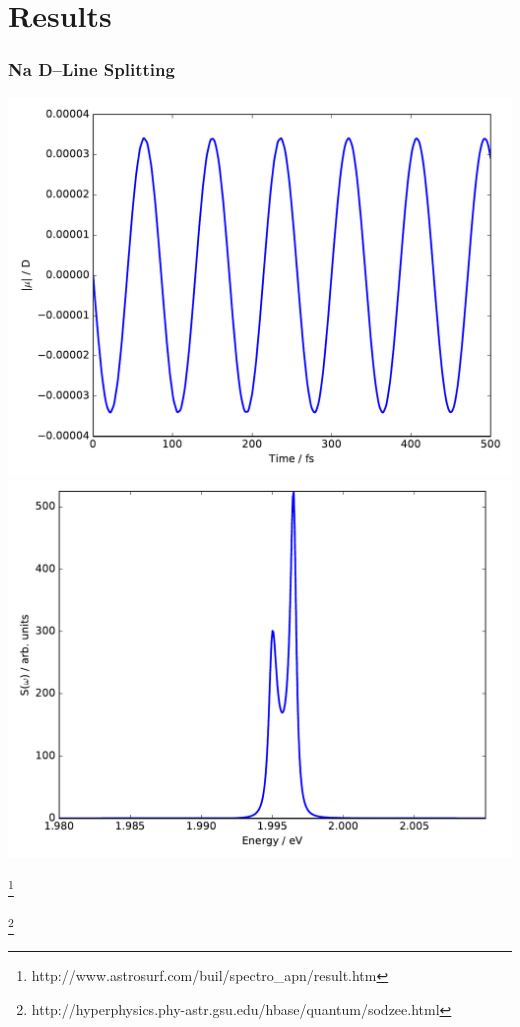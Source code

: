 \documentclass{beamer}
\newcommand\blfootnote[1]{%
  \begingroup
  \renewcommand\thefootnote{}\footnote{#1}%
  \addtocounter{footnote}{-1}%
  \endgroup
}
\begin{document}
\section{Results}

\begin{frame}
\frametitle{Na D--Line Splitting}

\begin{minipage}[h!]{0.45\textwidth}
\includegraphics[width=\textwidth]{na_fss_dipole}\\
\includegraphics[width=\textwidth]{na_fss}
\end{minipage}
\blfootnote{http://www.astrosurf.com/buil/spectro\_apn/result.htm}
\blfootnote{http://hyperphysics.phy-astr.gsu.edu/hbase/quantum/sodzee.html}
\begin{minipage}[h!]{0.50\textwidth}


\end{minipage}
\end{frame}
\end{document}
